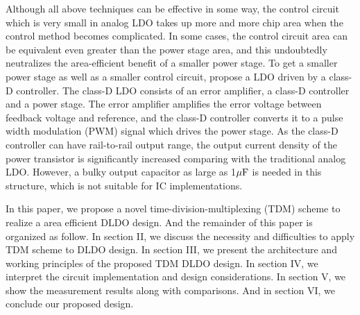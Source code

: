 \documentclass[journal]{IEEEtran}
\begin{document}
Although all above techniques can be effective in some way, the control circuit which is very small in analog LDO takes up more and more chip area when the control method becomes complicated. In some cases, the control circuit area can be equivalent even greater than the power stage area, and this undoubtedly neutralizes the area-efficient benefit of a smaller power stage. To get a smaller power stage as well as a smaller control circuit, \cite{ClassDLDO} propose a LDO driven by a class-D controller. The class-D LDO consists of an error amplifier, a class-D controller and a power stage. The error amplifier amplifies the error voltage between feedback voltage and reference, and the class-D controller converts it to a pulse width modulation (PWM) signal which drives the power stage. As the class-D controller can have rail-to-rail output range, the output current density of the power transistor is significantly increased comparing with the traditional analog LDO. However, a bulky output capacitor as large as 1$\rm \mu F$ is needed in this structure, which is not suitable for IC implementations.

In this paper, we propose a novel time-division-multiplexing (TDM) scheme to realize a area efficient DLDO design. And the remainder of this paper is organized as follow. In section II, we discuss the necessity and difficulties to apply TDM scheme to DLDO design. In section III, we present the architecture and working principles of the proposed TDM DLDO design. In section IV, we interpret the circuit implementation and design considerations. In section V, we show the measurement results along with comparisons. And in section VI, we conclude our proposed design.

\end{document}
